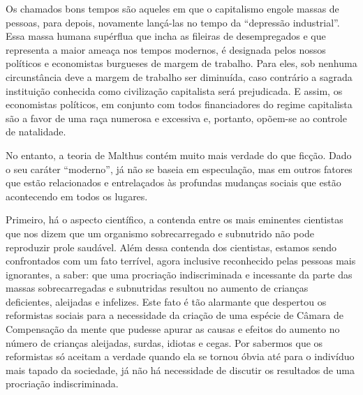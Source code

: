 Os chamados bons tempos são aqueles em que o capitalismo engole massas
de pessoas, para depois, novamente lançá-las no tempo da ``depressão
industrial''. Essa massa humana supérflua que incha as fileiras de
desempregados e que representa a maior ameaça nos tempos modernos, é
designada pelos nossos políticos e economistas burgueses de margem de
trabalho. Para eles, sob nenhuma circunstância deve a margem de trabalho
ser diminuída, caso contrário a sagrada instituição conhecida como
civilização capitalista será prejudicada. E assim, os economistas
políticos, em conjunto com todos financiadores do regime capitalista são
a favor de uma raça numerosa e excessiva e, portanto, opõem-se ao
controle de natalidade.

No entanto, a teoria de Malthus contém muito mais verdade do que ficção.
Dado o seu caráter ``moderno'', já não se baseia em especulação, mas em
outros fatores que estão relacionados e entrelaçados às profundas
mudanças sociais que estão acontecendo em todos os lugares.

Primeiro, há o aspecto científico, a contenda entre os mais eminentes
cientistas que nos dizem que um organismo sobrecarregado e subnutrido
não pode reproduzir prole saudável. Além dessa contenda dos cientistas,
estamos sendo confrontados com um fato terrível, agora inclusive
reconhecido pelas pessoas mais ignorantes, a saber: que uma procriação
indiscriminada e incessante da parte das massas sobrecarregadas e
subnutridas resultou no aumento de crianças deficientes, aleijadas e
infelizes. Este fato é tão alarmante que despertou os reformistas
sociais para a necessidade da criação de uma espécie de Câmara de
Compensação da mente que pudesse apurar as causas e efeitos do aumento
no número de crianças aleijadas, surdas, idiotas e cegas. Por sabermos
que os reformistas só aceitam a verdade quando ela se tornou óbvia até
para o indivíduo mais tapado da sociedade, já não há necessidade de
discutir os resultados de uma procriação indiscriminada.

